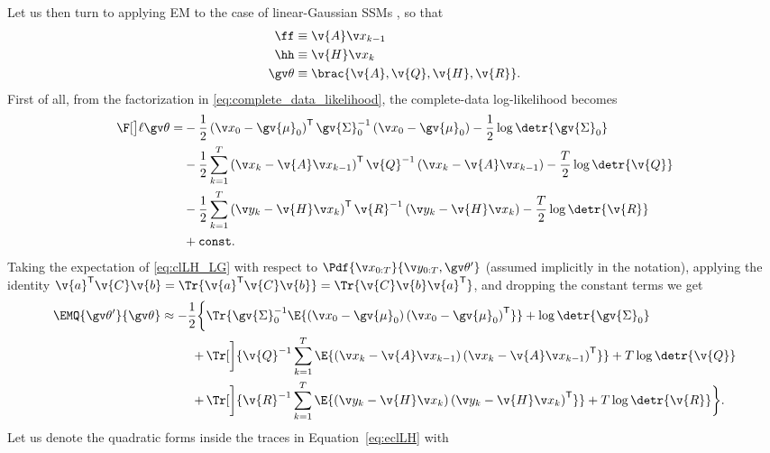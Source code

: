 Let us then turn to applying EM to the case of linear-Gaussian SSMs
\parencite{shumway1982approach,Ghahramani1996}
, so that
\begin{align*}
	\ff &\equiv \v{A}\xkk\\
	\hh &\equiv \v{H}\xk\\
	\Th &\equiv \brac{\v{A},\v{Q},\v{H},\v{R}}.
\end{align*}
First of all, from the factorization in \eqref{eq:complete_data_likelihood}, the complete-data log-likelihood becomes
\begin{align}
\begin{split}
	\lLH
	=&-\frac{1}{2}\left(\x_0-\gv{\mu}_0\right)^\tr\gv{\Sigma}_0^{-1}\left(\x_0-\gv{\mu}_0\right)-\frac{1}{2}\log\detr{\gv{\Sigma}_0}\\
	&-\frac{1}{2}\sum_{k=1}^T\left(\x_k-\v{A}\xkk\right)^\tr\v{Q}^{-1}\left(\x_k-\v{A}\xkk\right)-\frac{T}{2}\log\detr{\v{Q}}\\
	&-\frac{1}{2}\sum_{k=1}^T\left(\y_k-\v{H}\xk\right)^\tr\v{R}^{-1}\left(\y_k-\v{H}\xk\right)-\frac{T}{2}\log\detr{\v{R}}\\
	&+\mathtt{const}.
\end{split}
\label{eq:clLH_LG}
\end{align}
Taking the expectation of \eqref{eq:clLH_LG} with respect to $\Pdf{\X}{\Y,\Th'}$ (assumed implicitly in the notation),
applying the identity $\v{a}^\tr\v{C}\v{b}=\Tr{\v{a}^\tr\v{C}\v{b}}=\Tr{\v{C}\v{b}\v{a}^\tr}$, and dropping the constant terms we get
\begin{align}
\begin{split}
	\EMQ{\Th'}{\Th} \approx -\frac{1}{2}\bigg\{&\Tr{\gv{\Sigma}_0^{-1}\E{\left(\x_0-\gv{\mu}_0\right)\left(\x_0-\gv{\mu}_0\right)^\tr}}+\log\detr{\gv{\Sigma}_0}\\
	+\,&\Tr[\bigg]{\v{Q}^{-1}\sum_{k=1}^T\E{\left(\x_k-\v{A}\xkk\right)\left(\x_k-\v{A}\xkk\right)^\tr}}+T\log\detr{\v{Q}}\\
	+\,&\Tr[\bigg]{\v{R}^{-1}\sum_{k=1}^T\E{\left(\y_k-\v{H}\xk\right)\left(\y_k-\v{H}\xk\right)^\tr}}+T\log\detr{\v{R}}\bigg\}.
\end{split}
\label{eq:eclLH}
\end{align} 
Let us denote the quadratic forms inside the traces in Equation~\eqref{eq:eclLH} with
